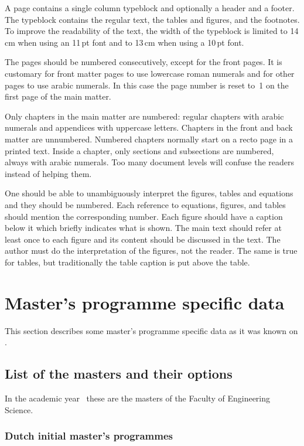 \documentclass[11pt,article,oneside,british,extralanguage=dutch]{kulemt}
\begin{document}
A page contains a single column typeblock and optionally a header and a
footer. The typeblock contains the regular text, the tables and figures,
and the footnotes. To improve the readability of the text, the width of the
typeblock is limited to 14\,cm when using an 11\,pt font and to 13\,cm when
using a 10\,pt font.

The pages should be numbered consecutively, except for the front pages. It
is customary for front matter pages to use lowercase roman numerals and for
other pages to use arabic numerals. In this case the page number is reset
to~1 on the first page of the main matter.

Only chapters in the main matter are numbered: regular chapters with arabic
numerals and appendices with uppercase letters. Chapters in the front and
back matter are unnumbered.
Numbered chapters normally start on a recto page in a printed text.
Inside a chapter, only sections and subsections are numbered, always with
arabic numerals. Too many document levels will confuse the readers instead of
helping them.

One should be able to unambiguously interpret the figures, tables and equations
and they should be numbered. Each reference to equations, figures, and tables
should mention the corresponding number. Each figure should have a caption
below it which briefly indicates what is shown. The main text should refer at
least once to each figure and its content should be discussed in the text. The
author must do the interpretation of the figures, not the reader. The same is
true for tables, but traditionally the table caption is put above the table.

\chapter{Master's programme specific data}
\ReadConfigFile

This section describes some master's programme specific data as it was known on
\PrintConfigFileDate.

\section{List of the masters and their options}
In the academic year \PrintConfigFileAcYr\ these are the masters of the Faculty
of Engineering Science.

\subsection*{Dutch initial master’s programmes}
\end{document}
